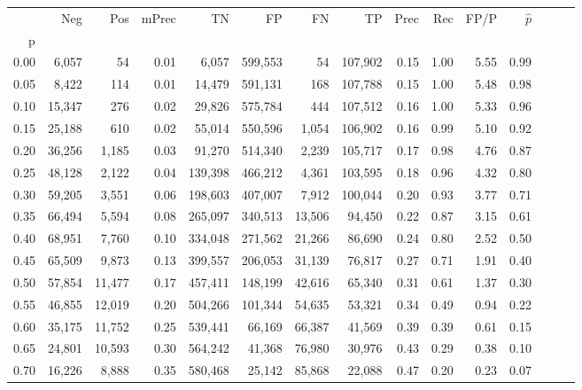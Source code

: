 \begin{tabular}{rrrrrrrrrrrrrrr}
\toprule
{} &     Neg &     Pos & mPrec &       TN &       FP &       FN &       TP &  Prec &   Rec &  FP/P & $\hat{p}$ \\
p    &         &         &       &          &          &          &          &       &       &       &           \\
\midrule
0.00 &   6,057 &      54 &  0.01 &    6,057 &  599,553 &       54 &  107,902 &  0.15 &  1.00 &  5.55 &      0.99 \\
0.05 &   8,422 &     114 &  0.01 &   14,479 &  591,131 &      168 &  107,788 &  0.15 &  1.00 &  5.48 &      0.98 \\
0.10 &  15,347 &     276 &  0.02 &   29,826 &  575,784 &      444 &  107,512 &  0.16 &  1.00 &  5.33 &      0.96 \\
0.15 &  25,188 &     610 &  0.02 &   55,014 &  550,596 &    1,054 &  106,902 &  0.16 &  0.99 &  5.10 &      0.92 \\
0.20 &  36,256 &   1,185 &  0.03 &   91,270 &  514,340 &    2,239 &  105,717 &  0.17 &  0.98 &  4.76 &      0.87 \\
0.25 &  48,128 &   2,122 &  0.04 &  139,398 &  466,212 &    4,361 &  103,595 &  0.18 &  0.96 &  4.32 &      0.80 \\
0.30 &  59,205 &   3,551 &  0.06 &  198,603 &  407,007 &    7,912 &  100,044 &  0.20 &  0.93 &  3.77 &      0.71 \\
0.35 &  66,494 &   5,594 &  0.08 &  265,097 &  340,513 &   13,506 &   94,450 &  0.22 &  0.87 &  3.15 &      0.61 \\
0.40 &  68,951 &   7,760 &  0.10 &  334,048 &  271,562 &   21,266 &   86,690 &  0.24 &  0.80 &  2.52 &      0.50 \\
0.45 &  65,509 &   9,873 &  0.13 &  399,557 &  206,053 &   31,139 &   76,817 &  0.27 &  0.71 &  1.91 &      0.40 \\
0.50 &  57,854 &  11,477 &  0.17 &  457,411 &  148,199 &   42,616 &   65,340 &  0.31 &  0.61 &  1.37 &      0.30 \\
0.55 &  46,855 &  12,019 &  0.20 &  504,266 &  101,344 &   54,635 &   53,321 &  0.34 &  0.49 &  0.94 &      0.22 \\
0.60 &  35,175 &  11,752 &  0.25 &  539,441 &   66,169 &   66,387 &   41,569 &  0.39 &  0.39 &  0.61 &      0.15 \\
0.65 &  24,801 &  10,593 &  0.30 &  564,242 &   41,368 &   76,980 &   30,976 &  0.43 &  0.29 &  0.38 &      0.10 \\
0.70 &  16,226 &   8,888 &  0.35 &  580,468 &   25,142 &   85,868 &   22,088 &  0.47 &  0.20 &  0.23 &      0.07 \\

\end{tabular}
